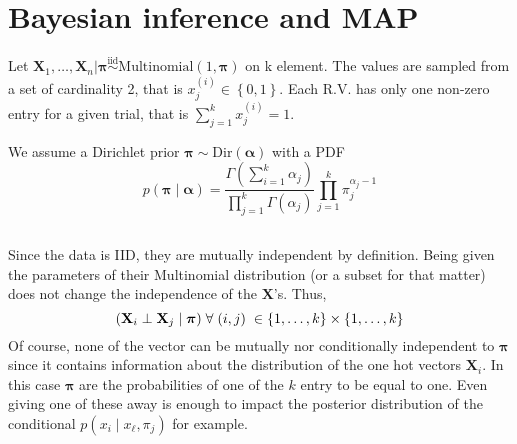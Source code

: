 \documentclass{article}
\newcommand{\s}{\hspace{0.1cm}}
\numberwithin{equation}{section}
\begin{document}
\section{Bayesian inference and MAP}
Let $\mathbf{X}_1, \dots , \mathbf{X}_n \bm{\mid} \bm{\pi} \overset{\text{iid} }{\sim} 
\text{Multinomial} (1, \bm{ \pi} )$ on k element. The values are sampled from a set of cardinality 
2, that is $x^{(i)}_j \in \left\{ 0, 1 \right\}$. Each R.V. has only one non-zero 
entry for a given trial, that is $\sum_{j = 1}^k x^{(i)}_j = 1$. \par
We assume a Dirichlet prior $\bm{ \pi} \sim \text{Dir} ( \bm{ \alpha} )$ with 
a PDF
\[
        p(\bm{ \pi}  \mid \bm{ \alpha} ) = \frac{\Gamma ( \sum _{i = 1}^k \alpha_j) }{
        \prod_{j=1}^k \Gamma(\alpha_j)} \prod_{j = 1}^k \pi_j^{\alpha_j - 1}
\]

\subsection{}
Since the data is IID, they are mutually independent by definition. Being given the 
parameters of their Multinomial distribution (or a subset for that matter) 
does not change the independence of the $\mathbf{X}$'s. Thus, 
\[
        (\mathbf{X}_i \perp \mathbf{X}_j \mid \bm{ \pi}) \s \forall \s (i,j) \s \in 
        \left\{ 1,\dots ,k \right\} \times \left\{ 1,\dots ,k \right\}
\]
Of course, none of the vector can be mutually nor conditionally independent to $\bm{ \pi} $ 
since it contains information about the distribution of the one hot vectors $\mathbf{X}_i$. 
In this case $\bm{ \pi} $ are the probabilities of one of the $k$ entry to be equal 
to one. Even giving one of these away is enough to impact the posterior distribution 
of the conditional $p(x_i\mid x_\ell, \pi_j )$ for example.
\end{document}
